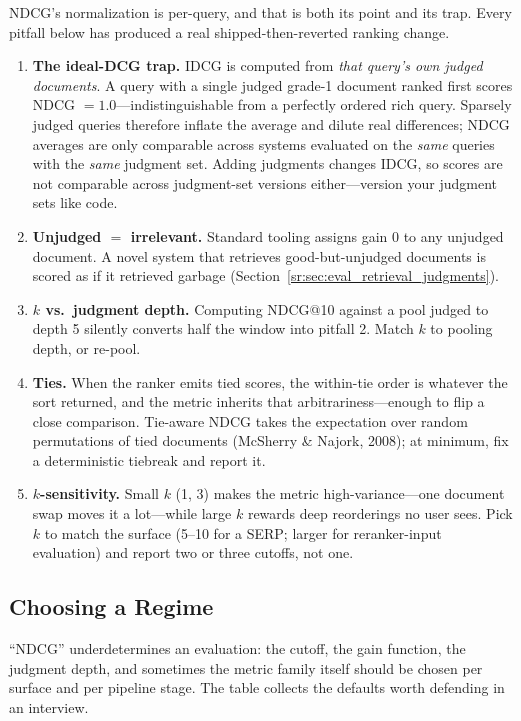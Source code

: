 \begin{warningbox}
NDCG's normalization is per-query, and that is both its point and its trap. Every pitfall below has produced a real shipped-then-reverted ranking change.
\begin{enumerate}
    \item \textbf{The ideal-DCG trap.} IDCG is computed from \textit{that query's own judged documents}. A query with a single judged grade-1 document ranked first scores NDCG $= 1.0$---indistinguishable from a perfectly ordered rich query. Sparsely judged queries therefore inflate the average and dilute real differences; NDCG averages are only comparable across systems evaluated on the \textit{same} queries with the \textit{same} judgment set. Adding judgments changes IDCG, so scores are not comparable across judgment-set versions either---version your judgment sets like code.
    \item \textbf{Unjudged $=$ irrelevant.} Standard tooling assigns gain 0 to any unjudged document. A novel system that retrieves good-but-unjudged documents is scored as if it retrieved garbage (Section~\ref{sr:sec:eval_retrieval_judgments}).
    \item \textbf{$k$ vs.\ judgment depth.} Computing NDCG@10 against a pool judged to depth 5 silently converts half the window into pitfall 2. Match $k$ to pooling depth, or re-pool.
    \item \textbf{Ties.} When the ranker emits tied scores, the within-tie order is whatever the sort returned, and the metric inherits that arbitrariness---enough to flip a close comparison. Tie-aware NDCG takes the expectation over random permutations of tied documents (McSherry \& Najork, 2008); at minimum, fix a deterministic tiebreak and report it.
    \item \textbf{$k$-sensitivity.} Small $k$ (1, 3) makes the metric high-variance---one document swap moves it a lot---while large $k$ rewards deep reorderings no user sees. Pick $k$ to match the surface (5--10 for a SERP; larger for reranker-input evaluation) and report two or three cutoffs, not one.
\end{enumerate}
\end{warningbox}

\subsection{Choosing a Regime}

``NDCG'' underdetermines an evaluation: the cutoff, the gain function, the judgment depth, and sometimes the metric family itself should be chosen per surface and per pipeline stage. The table collects the defaults worth defending in an interview.

